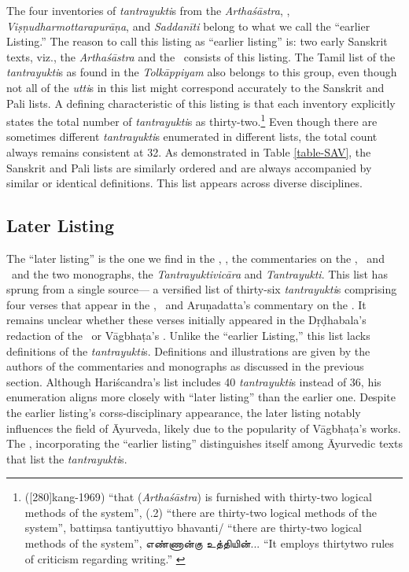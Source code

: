 The four inventories of \emph{tantrayukti}s from the \emph{Arthaśāstra}, \SS, 
\emph{Viṣṇudharmottarapurāṇa}, and \emph{Saddanīti} belong to what we call 
the “earlier Listing.” The reason to call this listing as “earlier listing” is: two early 
Sanskrit texts, viz., the \emph{Arthaśāstra} and the \SS\ consists of this listing. 
The 
Tamil list of the \emph{tantrayukti}s as found in the \emph{Tolkāppiyam} also 
belongs to this group, even though not all of the \emph{utti}s in this list might 
correspond accurately to the Sanskrit and Pali lists. A defining characteristic of 
this 
listing is that each inventory explicitly states the total number of 
\emph{tantrayukti}s as thirty-two.\footnote{
	 ([280]{kang-1969}) 
“that (\emph{Arthaśāstra}) is furnished with thirty-two logical methods of the 
system”,
	 (.2) “there are 
thirty-two logical methods of the system”,
	battiṃsa tantiyuttiyo bhavanti/ \parencite[\emph{Suttamālā}, 
28][920]{smit-1930} “there are thirty-two logical methods of the system”,		
	\texttamil{எண்ணான்கு உத்தியின்}... “It employs thirtytwo rules of criticism 
regarding writing.” \parencite[9--10]{srip-1995}} 
Even though there are sometimes different \emph{tantrayukti}s enumerated in 
different lists, the total count always remains consistent at 32. As demonstrated 
in 
Table \ref{table-SAV}, the Sanskrit and Pali lists are similarly ordered and are 
always accompanied by similar or identical definitions. This list appears across 
diverse disciplines.

\subsection{Later Listing}

The “later listing” is the one we find in the \AS, \CS, the commentaries on the \CS, 
\AS\ and \AHS\ and the two monographs, the \emph{Tantrayuktivicāra} and 
\emph{Tantrayukti}. This list has sprung from a single source--- a versified list of 
thirty-six \emph{tantrayukti}s comprising four verses that appear in the \AS, \CS\ 
and Aruṇadatta's commentary on the \AHS. It remains unclear whether these 
verses initially appeared in the Dṛḍhabala's redaction of the \CS\ or Vāgbhaṭa's 
\AS. 
Unlike the “earlier Listing,” this list lacks definitions of the \emph{tantrayukti}s. 
Definitions and illustrations are given by the authors of the commentaries and 
monographs as discussed in the previous section. Although Hariścandra's list 
includes 40 \emph{tantrayukti}s instead of 36, his enumeration aligns more 
closely with “later listing” than the earlier one. Despite the earlier listing's 
corss-disciplinary appearance, the later listing notably influences the field of 
Āyurveda, likely due to the popularity of Vāgbhaṭa's works. The \SS, 
incorporating 
the “earlier listing” distinguishes itself among Āyurvedic texts that list the 
\emph{tantrayukti}s.  

